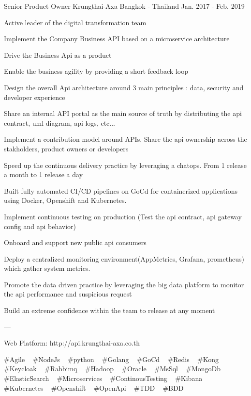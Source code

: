 \begin{cventries}
  \cventry
    {Senior Product Owner} %
    {Krungthai-Axa} %
    {Bangkok - Thailand} %
    {Jan. 2017 - Feb. 2019} %
    {
      \begin{cvitems} %
        \item {Active leader of the digital transformation team}
        \item {Implement the Company Business API based on a microservice architecture}
        \item {Drive the Business Api as a product}
        \item {Enable the business agility by providing a short feedback loop}
        \item {Design the overall Api architecture around 3 main principles : data, security and developer experience}
        \item {Share an internal API portal as the main source of truth by distributing the api contract, uml diagram, api logs, etc...}
        \item {Implement a contribution model around APIs. Share the api ownership across the stakholders, product owners or developers}
        \item {Speed up the continuous delivery practice by leveraging a chatops. From 1 release a month to 1 release a day}
        \item {Built fully automated CI/CD pipelines on GoCd for containerized applications using Docker, Openshift and Kubernetes.}
        \item {Implement continuous testing on production (Test the api contract, api gateway config and api behavior)}
        \item {Onboard and support new public api consumers}
        \item {Deploy a centralized monitoring environment(AppMetrics, Grafana, prometheus) which gather system metrics.}
        \item {Promote the data driven practice by leveraging the big data platform to monitor the api performance and suspicious request}
        \item {Build an extreme confidence within the team to release at any moment}
        \item {---}
        \item {Web Platform: http://api.krungthai-axa.co.th}
      \end{cvitems}
    }
    {
      \#Agile ~
      \#NodeJs ~
      \#python ~
      \#Golang ~
      \#GoCd ~
      \#Redis ~
      \#Kong ~
      \#Keycloak ~
      \#Rabbimq ~
      \#Hadoop ~
      \#Oracle ~
      \#MsSql ~
      \#MongoDb ~
      \#ElasticSearch ~
      \#Microservices ~
      \#ContinousTesting ~
      \#Kibana ~
      \#Kubernetes ~
      \#Openshift ~
      \#OpenApi ~
      \#TDD ~
      \#BDD
    }


\end{cventries}
